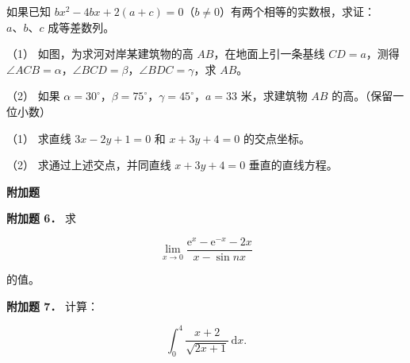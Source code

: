 \begin{question}
如果已知 $bx^2-4bx+2(a+c)=0$（$b\ne0$）有两个相等的实数根，求证：$a\text{、}b\text{、}c$ 成等差数列。

\Needspace{0.4\textheight}
\end{question}
\begin{question}

（1） 如图，为求河对岸某建筑物的高 $AB$，在地面上引一条基线 $CD=a$，测得 $\angle ACB=\alpha$，$\angle BCD=\beta$，$\angle BDC=\gamma$，求 $AB$。
\nopagebreak[4]
\begin{center}\end{center}
\nopagebreak[4]
（2） 如果 $\alpha=30^\circ$，$\beta=75^\circ$，$\gamma=45^\circ$，$a=33$ 米，求建筑物 $AB$ 的高。（保留一位小数）

\end{question}
\begin{question}

（1） 求直线 $3x-2y+1=0$ 和 $x+3y+4=0$ 的交点坐标。

（2） 求通过上述交点，并同直线 $x+3y+4=0$ 垂直的直线方程。

\begin{gktip}
\Needspace{0.25\textheight}
\textbf{附加题}
\end{gktip}

\textbf{附加题 6．} 求

\nopagebreak[4]
\[
\lim_{x\to0}\frac{\mathrm e^x-\mathrm e^{-x}-2x}{x-\sin nx}
\]

的值。

\textbf{附加题 7．} 计算：

\nopagebreak[4]
\[
\int_0^4\frac{x+2}{\sqrt{2x+1}}\,\mathrm dx.
\]

\end{question}